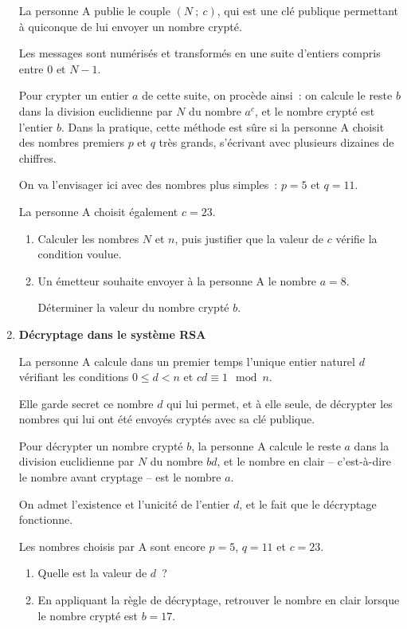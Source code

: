 \begin{enumerate}
     \par
     La personne A publie le couple $(N~;~c)$, qui est une clé publique permettant à quiconque de lui
     envoyer un nombre crypté.
     \par
     Les messages sont numérisés et transformés en une suite d'entiers compris entre $0$ et $N -1$.
     \par
     Pour crypter un entier $a$ de cette suite, on procède ainsi~: on calcule le reste $b$ dans la division
     euclidienne par $N$ du nombre $a^c$, et le nombre crypté est l'entier $b$.
     \smallskip
     Dans la pratique, cette méthode est sûre si la personne A choisit des nombres premiers $p$ et $q$
     très grands, s'écrivant avec plusieurs dizaines de chiffres.
     \par
     On va l'envisager ici avec des nombres plus simples~: $p = 5$ et $q = 11$.
     \par
     La personne A choisit également $c = 23$.
     \begin{enumerate}[label=\alph*.]
          \item Calculer les nombres $N$ et $n$, puis justifier que la valeur de $c$ vérifie la condition voulue.
          \item  Un émetteur souhaite envoyer à la personne A le nombre $a = 8$.
          \par
          Déterminer la valeur du nombre crypté $b$.
     \end{enumerate}
     \item  \textbf{Décryptage dans le système RSA}
     \par
     La personne A calcule dans un premier temps l'unique entier naturel $d$ vérifiant les conditions
     $0 \leqslant d < n$ et $cd \equiv 1 \mod n$.
     \par
     Elle garde secret ce nombre $d$ qui lui permet, et à elle seule, de
     décrypter les nombres qui lui ont été envoyés cryptés avec sa clé publique.
     \par
     Pour décrypter un nombre crypté $b$, la personne A calcule le reste $a$ dans la division euclidienne
     par $N$ du nombre $bd$, et le nombre en clair -- c'est-à-dire le nombre avant cryptage -- est le
     nombre $a$.
     \par
     On admet l'existence et l'unicité de l'entier $d$, et le fait que le décryptage fonctionne.
     \par
     Les nombres choisis par A sont encore $p = 5$, $q = 11$ et $c = 23$.
     \begin{enumerate}[label=\alph*.]
          \item Quelle est la valeur de $d$~?
          \item  En appliquant la règle de décryptage, retrouver le nombre en clair lorsque le nombre crypté
          est $b = 17$.
     \end{enumerate}
\end{enumerate}
